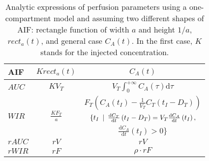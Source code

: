 \begin{table}[h!]
\begin{center}
\begin{tabular}{lcc}
\toprule
AIF & $K rect_a\left(t\right)$ & $C_A \left(t\right)$ \\
\midrule
\textbf{$AUC$} & $KV_T$ & $V_T \int_{0}^{+\infty}C_A\left(\tau\right)\mathrm d\tau$\\
\midrule
\multirow{3}{*}{\textbf{$WIR$}}
 & \multirow{3}{*}{{$\frac{KF_T}{a}$}} & $F_T\left(C_A\left(t_{I}\right)-\frac{1}{V_T}C_T\left(t_{I} - D_T\right)\right)$ \\
 & & $\{ t_{I} \enskip\vert\enskip \frac{\mathrm d C_T}{\mathrm dt}\left(t_{I} - D_T\right) = V_T \frac{\mathrm d C_A}{\mathrm dt}\left(t_{I}\right),$ \\
 & & $\frac{\mathrm d C_A}{\mathrm d t}\left(t_{I}\right) > 0\}$ \\
\midrule
\textbf{$rAUC$} & $rV$ & $rV$\\
\midrule
\textbf{$rWIR$} & $rF$ & $\rho \cdot rF$\\
\bottomrule
\end{tabular}
\caption{Analytic expressions of perfusion parameters using a one-compartment model and assuming two different shapes of AIF: rectangle function of width $a$ and height $1/a$, $rect_a(t)$, and general case $C_A(t)$. In the first case, $K$ stands for the injected concentration.}
\label{tab:AppAnalyticRelationAIF}
\end{center}
\end{table}


